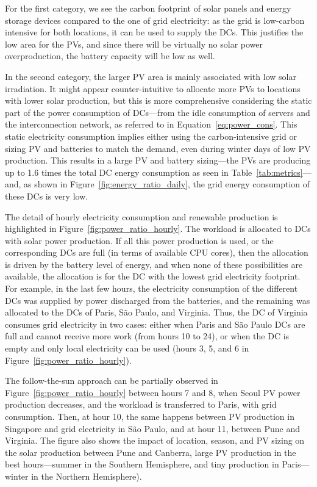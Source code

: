 For the first category, we see the carbon footprint of solar panels and energy storage devices compared to the one of grid electricity: as the grid is low-carbon intensive for both locations, it can be used to supply the DCs. This justifies the low area for the PVs, and since there will be virtually no solar power overproduction, the battery capacity will be low as well. 

In the second category, the larger PV area is mainly associated with low solar irradiation. It might appear counter-intuitive to allocate more PVs to locations with lower solar production, but this is more comprehensive considering the static part of the power consumption of DCs---from the idle consumption of servers and the interconnection network, as referred to in Equation~\eqref{eq:power_cons}. This static electricity consumption implies either using the carbon-intensive grid or sizing PV and batteries to match the demand, even during winter days of low PV production. This results in a large PV and battery sizing---the PVs are producing up to 1.6 times the total DC energy consumption as seen in Table~\ref{tab:metrics}---and, as shown in Figure~\ref{fig:energy_ratio_daily}, the grid energy consumption of these DCs is very low.


The detail of hourly electricity consumption and renewable production is highlighted in Figure~\ref{fig:power_ratio_hourly}. The workload is allocated to DCs with solar power production. If all this power production is used, or the corresponding DCs are full (in terms of available CPU cores), then the allocation is driven by the battery level of energy, and when none of these possibilities are available, the allocation is for the DC with the lowest grid electricity footprint. For example, in the last few hours, the electricity consumption of the different DCs was supplied by power discharged from the batteries, and the remaining was allocated to the DCs of Paris, S\~ao Paulo, and Virginia. Thus, the DC of Virginia consumes grid electricity in two cases: either when Paris and S\~ao Paulo DCs are full and cannot receive more work (from hours 10 to 24), or when the DC is empty and only local electricity can be used (hours 3, 5, and 6 in Figure~\ref{fig:power_ratio_hourly}). 

The follow-the-sun approach can be partially observed in Figure~\ref{fig:power_ratio_hourly} between hours 7 and 8, when Seoul PV power production decreases, and the workload is transferred to Paris, with grid consumption. Then, at hour 10, the same happens between PV production in Singapore and grid electricity in S\~ao Paulo, and at hour 11, between Pune and Virginia. The figure also shows the impact of location, season, and PV sizing on the solar production between Pune and Canberra, large PV production in the best hours---summer in the Southern Hemisphere, and tiny production in Paris---winter in the Northern Hemisphere).


